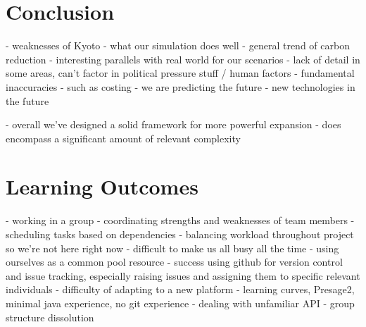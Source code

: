 \section{Conclusion}

- weaknesses of Kyoto
- what our simulation does well
- general trend of carbon reduction
- interesting parallels with real world for our scenarios
- lack of detail in some areas, can't factor in political pressure stuff / human factors
- fundamental inaccuracies - such as costing
- we are predicting the future
- new technologies in the future

- overall we've designed a solid framework for more powerful expansion
- does encompass a significant amount of relevant complexity

\section{Learning Outcomes}

- working in a group
- coordinating strengths and weaknesses of team members
- scheduling tasks based on dependencies
- balancing workload throughout project so we're not here right now
- difficult to make us all busy all the time
- using ourselves as a common pool resource
- success using github for version control and issue tracking, especially raising issues and assigning them to specific relevant individuals
- difficulty of adapting to a new platform - learning curves, Presage2, minimal java experience, no git experience
- dealing with unfamiliar API
- group structure dissolution
